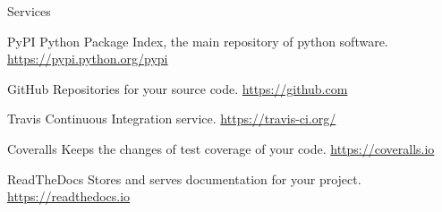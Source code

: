 \begin{frame}{Services}
    \begin{block}{PyPI}
        Python Package Index, the main repository of python software.
        \href{https://pypi.python.org/pypi}{https://pypi.python.org/pypi}
    \end{block}
    \pause
    \begin{block}{GitHub}
        Repositories for your source code.
        \href{https://github.com}{https://github.com}
    \end{block}
    \pause
    \begin{block}{Travis}
        Continuous Integration service.
        \href{https://travis-ci.org/}{https://travis-ci.org/}
    \end{block}
    \pause
    \begin{block}{Coveralls}
        Keeps the changes of test coverage of your code.
        \href{https://coveralls.io}{https://coveralls.io}
    \end{block}
    \pause
    \begin{block}{ReadTheDocs}
        Stores and serves documentation for your project.
        \href{https://readthedocs.io}{https://readthedocs.io}
    \end{block}
\end{frame}


